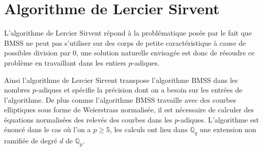 \documentclass[10pt,a4paper]{book}
\theoremstyle{plain}
\theoremstyle{definition}
\theoremstyle{definition}
\theoremstyle{definition}
\theoremstyle{definition}
\theoremstyle{remark}
\theoremstyle{remark}
\theoremstyle{definition}
\begin{document}


\section{Algorithme de Lercier Sirvent}
L'algorithme de Lercier Sirvent répond à la problématique posée par le fait que BMSS ne peut pas s'utiliser sur des corps de petite caractéristique à cause de possibles division par $0$, une solution naturelle envisagée est donc de résoudre ce problème en travaillant dans les entiers $p$-adiques.

Ainsi l'algorithme de Lercier Sirvent transpose l'algorithme BMSS dans les 
nombres $p$-adiques et spécifie la précision dont on a besoin sur les entrées 
de l'algorithme. De plus comme l'algorithme  BMSS travaille avec des courbes 
elliptiques sous forme de Weierstrass normalisée, il est nécessaire de calculer
des équations normalisées des relevés des courbes dans les $p$-adiques. 
L'algorithme est énoncé dans le cas où l'on a $p \geqslant 5$, les calculs ont 
lieu dans $\mathbb{Q}_q$ une extension non ramifiée de degré $d$ de $\mathbb{Q}_p$.
\end{document}
